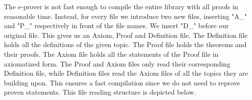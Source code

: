 \documentclass[11pt]{article}
\begin{document}
\begin{figure}[h]
\begin{center}
\end{center}
\end{figure}

\newpage

The e-prover is not fast enough to compile the entire library with all proofs in reasonable time. 
Instead, for every file we introduce two new files, inserting "A\_" and "P\_" respectively in front of the file names. We insert "D\_" before our original file. This gives us an Axiom, Proof and Definition file. 
The Definition file holds all the definitions of the given topic. 
The Proof file holds the theorems and their proofs. The Axiom file holds all the statements of the Proof file in axiomatized form. 
The Proof and Axiom files only read their corresponding Definition file, while Definition files read the Axiom files of all the topics they are building upon. 
This ensures a fast compilation since we do not need to reprove proven statements. 
This file reading structure is depicted below.
\end{document}
